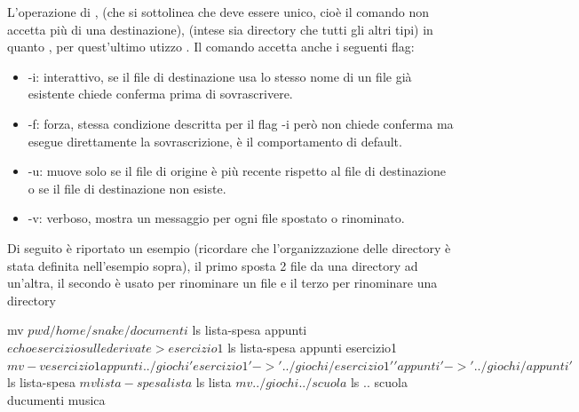 L'operazione di ,  (che si sottolinea che deve essere unico, cioè il comando non accetta più di una destinazione),  (intese sia directory che tutti gli altri tipi) in quanto , per quest'ultimo utizzo . Il comando  accetta anche i seguenti flag:
\begin{itemize}
    \item -i: interattivo, se il file di destinazione usa lo stesso nome di un file già esistente chiede conferma prima di sovrascrivere.
    \item -f: forza, stessa condizione descritta per il flag -i però non chiede conferma ma esegue direttamente la sovrascrizione, è il comportamento di default.
    \item -u: muove solo se il file di origine è più recente rispetto al file di destinazione o se il file di destinazione non esiste.
    \item -v: verboso, mostra un messaggio per ogni file spostato o rinominato.
\end{itemize}
Di seguito è riportato un esempio (ricordare che l'organizzazione delle directory è stata definita nell'esempio sopra), il primo  sposta 2 file da una directory ad un'altra, il secondo è usato per rinominare un file e il terzo per rinominare una directory
\begin{cmdc}{}{mv}
	$ pwd
	/home/snake/documenti
	$ ls
	lista-spesa appunti
	$ echo esercizio sulle derivate > esercizio1
	$ ls
	lista-spesa appunti esercizio1
	$ mv -v esercizio1 appunti ../giochi
	'esercizio1' -> '../giochi/esercizio1'
	'appunti' -> '../giochi/appunti'
	$ ls
	lista-spesa
	$ mv lista-spesa lista
	$ ls
	lista
	$ mv ../giochi ../scuola
	$ ls ..
	scuola ducumenti musica
\end{cmdc}

